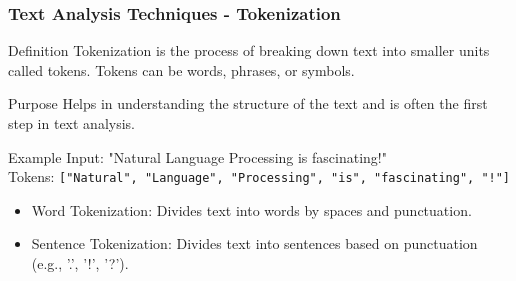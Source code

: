 \documentclass[aspectratio=169]{beamer}
\begin{document}
\begin{frame}[fragile]
    \frametitle{Text Analysis Techniques - Tokenization}
    \begin{block}{Definition}
        Tokenization is the process of breaking down text into smaller units called tokens. Tokens can be words, phrases, or symbols.
    \end{block}
    
    \begin{block}{Purpose}
        Helps in understanding the structure of the text and is often the first step in text analysis.
    \end{block}
    
    \begin{exampleblock}{Example}
        Input: "Natural Language Processing is fascinating!" \\
        Tokens: \texttt{["Natural", "Language", "Processing", "is", "fascinating", "!"]}
    \end{exampleblock}

    \begin{itemize}
        \item Word Tokenization: Divides text into words by spaces and punctuation.
        \item Sentence Tokenization: Divides text into sentences based on punctuation (e.g., '.', '!', '?').
    \end{itemize}
\end{frame}
\end{document}
